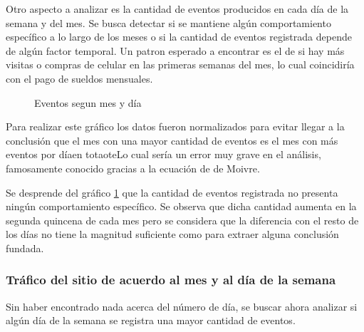 \documentclass[a4paper]{article}
\begin{document}
Otro aspecto a analizar es la cantidad de eventos producidos en cada día de la semana y del mes. Se busca detectar si se mantiene algún comportamiento específico a lo largo de los meses o si la cantidad de eventos registrada depende de algún factor temporal. Un patron esperado a encontrar es el de si hay más visitas o compras de celular en las primeras semanas del mes, lo cual coincidiría con el pago de sueldos mensuales.

\begin{figure}[!h]
	\caption{Eventos segun mes y día}
	\label{fig:mesdiasnormalizado}
\end{figure}

Para realizar este gráfico los datos fueron normalizados para evitar llegar a la conclusión que el mes con una mayor cantidad de eventos es el mes con más eventos por díaen totaote{Lo cual sería un error muy grave en el análisis, famosamente conocido gracias a la ecuación de de Moivre}. 

Se desprende del gráfico \ref{fig:mesdiasnormalizado} que la cantidad de eventos registrada no presenta ningún comportamiento específico. Se observa que dicha cantidad aumenta en la segunda quincena de cada mes pero se considera que la diferencia con el resto de los días no tiene la magnitud suficiente como para extraer alguna conclusión fundada. 

\subsubsection{Tráfico del sitio de acuerdo al mes y al día de la semana}

Sin haber encontrado nada acerca del número de día, se buscar ahora analizar si algún día de la semana se registra una mayor cantidad de eventos. 
\end{document}
